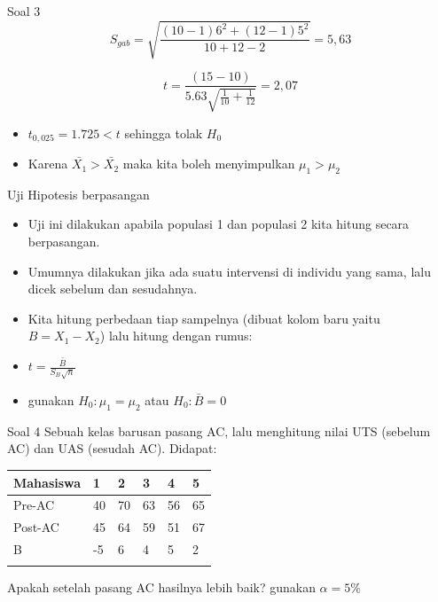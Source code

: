 \documentclass[
  ignorenonframetext,
]{beamer}
\begin{document}
\begin{frame}{Soal 3}
\label{soal-3-2}
\[
S_{gab}=\sqrt{\frac{(10-1)6^2+(12-1)5^2}{10+12-2}}= 5,63
\]

\[
t=\frac{(15-10)}{5.63\sqrt{\frac{1}{10}+\frac{1}{12}}}=2,07
\]

\begin{itemize}
\item
  \(t_{0,025}=1.725 < t\) sehingga tolak \(H_0\)
\item
  Karena \(\bar{X_1}>\bar{X_2}\) maka kita boleh menyimpulkan
  \(\mu_1>\mu_2\)
\end{itemize}
\end{frame}

\begin{frame}{Uji Hipotesis berpasangan}
\label{uji-hipotesis-berpasangan}
\begin{itemize}
\item
  Uji ini dilakukan apabila populasi 1 dan populasi 2 kita hitung secara
  berpasangan.
\item
  Umumnya dilakukan jika ada suatu intervensi di individu yang sama,
  lalu dicek sebelum dan sesudahnya.
\item
  Kita hitung perbedaan tiap sampelnya (dibuat kolom baru yaitu
  \(B=X_1-X_2\)) lalu hitung dengan rumus:
\item
  \(t=\frac{\bar{B}}{S_B\sqrt{n}}\)
\item
  gunakan \(H_0: \mu_1=\mu_2\) atau \(H_0: \bar{B}=0\)
\end{itemize}
\end{frame}

\begin{frame}{Soal 4}
\label{soal-4}
Sebuah kelas barusan pasang AC, lalu menghitung nilai UTS (sebelum AC)
dan UAS (sesudah AC). Didapat:

\begin{longtable}[]{@{}llllll@{}}
\toprule\noalign{}
Mahasiswa & 1 & 2 & 3 & 4 & 5 \\
\midrule\noalign{}
\endhead
Pre-AC & 40 & 70 & 63 & 56 & 65 \\
Post-AC & 45 & 64 & 59 & 51 & 67 \\
B & -5 & 6 & 4 & 5 & 2 \\
\bottomrule\noalign{}
\end{longtable}

Apakah setelah pasang AC hasilnya lebih baik? gunakan \(\alpha=5\%\)
\end{frame}
\end{document}
